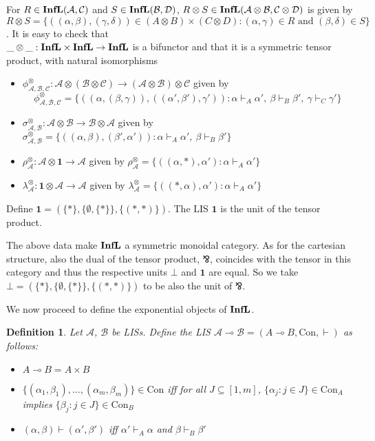 \documentclass[copyright,creativecommons]{eptcs}
\newtheorem{definition}[theorem]{Definition}
\newcommand{\cA}{\mathcal{A}}
\newcommand{\cB}{\mathcal{B}}
\newcommand{\cC}{\mathcal{C}}
\newcommand{\cD}{\mathcal{D}}
\newcommand{\ga}{\alpha}
\newcommand{\gb}{\beta}
\newcommand{\gc}{\gamma}
\newcommand{\gd}{\delta}
\newcommand{\Con}{\mathrm{Con}} \newcommand{\Com}{\mathrm{Com}} \newcommand{\Sup}{\mathrm{Sup}} %
\begin{document}
For $R \in \Infl(\cA, \cC)$ and $S \in \Infl(\cB, \cD)$, $R \otimes S \in \Infl(\cA \otimes \cB, \cC \otimes \cD)$ is given by \\ \mbox{$R \otimes S = \{((\ga,\gb), (\gc,\gd)) \in (A \otimes B) \times (C \otimes D) : (\ga,\gc) \in R \textrm{ and } (\gb,\gd) \in S \}$.} It is easy to check that \\ \mbox{$\_ \otimes \_ : \mathbf{InfL} \times \mathbf{InfL} \to \mathbf{InfL}$} is a bifunctor and that it is a symmetric tensor product, with natural isomorphisms
\begin{itemize}
\item $\phi_{\cA,\cB,\cC}^\otimes : \cA \otimes (\cB \otimes \cC) \to (\cA \otimes \cB) \otimes \cC$ given by 
$$ \phi_{\cA,\cB,\cC}^\otimes = \{( (\ga,(\gb,\gc)),((\ga',\gb'),\gc') ) : \ga \vdash_A \ga',\ \gb \vdash_B \gb',\ \gc \vdash_C \gc' \} $$

\item $\sigma_{\cA,\cB}^\otimes: \cA \otimes \cB \to \cB \otimes \cA$ given by $\sigma_{\cA,\cB}^\otimes = \{((\ga,\gb), (\gb',\ga')) : \ga \vdash_A \ga',\ \gb \vdash_B \gb'\}$

\item $\rho_\cA^\otimes: \cA \otimes \mathbf{1} \to \cA$ given by $ \rho_\cA^\otimes = \{((\ga, \ast),\ga') : \ga \vdash_A \ga'\}$

\item $\lambda_\cA^\otimes: \mathbf{1} \otimes \cA \to \cA$ given by $\lambda_\cA^\otimes = \{((\ast, \ga),\ga') : \ga \vdash_A \ga'\}$
\end{itemize}

Define $\mathbf{1} = (\{\ast\}, \{\emptyset, \{\ast\}\},\{(\ast, \ast)\})$. The LIS $\mathbf{1}$ is the unit of the tensor product.

The above data make $\mathbf{InfL}$ a symmetric monoidal category. As for the cartesian structure, also the dual of the tensor product, $\bindnasrepma$, coincides with the tensor in this category and thus the respective units $\bot$ and $\mathbf{1}$ are equal. So we take $\bot = (\{\ast\}, \{\emptyset, \{\ast\}\},\{(\ast, \ast)\})$ to be also the unit of $\bindnasrepma$.

\medskip

We now proceed to define the exponential objects of $\mathbf{InfL}$.

\begin{definition}
Let $\cA$, $\cB$ be LISs. Define the LIS $\cA \multimap \cB = (A \multimap B, \Con, \vdash)$ as follows:
\begin{itemize}
\item $A \multimap B = A \times B$
\item $\{(\ga_1, \gb_1), \ldots, (\ga_m, \gb_m)\} \in \Con$ iff for all $J \subseteq [1,m]$, $\{\ga_j : j \in J\} \in \Con_A$ implies $\{\gb_j : j \in J\} \in \Con_B$
\item $(\ga,\gb) \vdash (\ga',\gb')$ iff $\ga' \vdash_A \ga$ and $\gb \vdash_B \gb'$
\end{itemize}
\end{definition}
\end{document}
